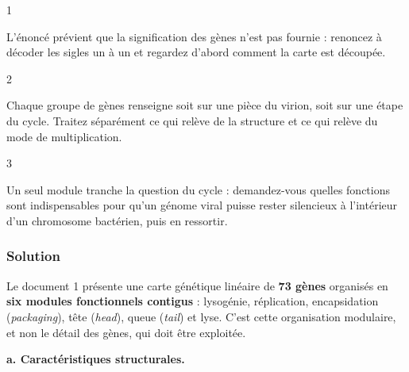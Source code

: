 \documentclass[11pt,a4paper]{article}
\begin{document}
\begin{indication}{1}

L'énoncé prévient que la signification des gènes n'est pas fournie : renoncez à décoder les sigles un à un et regardez d'abord comment la carte est découpée.

\end{indication}

\begin{indication}{2}

Chaque groupe de gènes renseigne soit sur une pièce du virion, soit sur une étape du cycle. Traitez séparément ce qui relève de la structure et ce qui relève du mode de multiplication.

\end{indication}

\begin{indication}{3}

Un seul module tranche la question du cycle : demandez-vous quelles fonctions sont indispensables pour qu'un génome viral puisse rester silencieux à l'intérieur d'un chromosome bactérien, puis en ressortir.

\end{indication}

\hypertarget{solution}{%
\subsubsection{Solution}\label{solution}}

Le document 1 présente une carte génétique linéaire de \textbf{73 gènes} organisés en \textbf{six modules fonctionnels contigus} : lysogénie, réplication, encapsidation (\emph{packaging}), tête (\emph{head}), queue (\emph{tail}) et lyse. C'est cette organisation modulaire, et non le détail des gènes, qui doit être exploitée.

\textbf{a. Caractéristiques structurales.}
\end{document}
